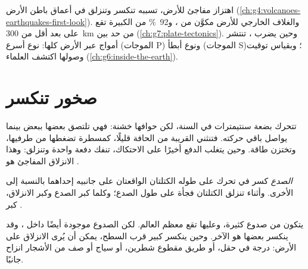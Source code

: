 \begin{recall}
\emph{} اهتزاز مفاجئ للأرض، تسببه  تنكسر وتنزلق في أعماق باطن
الأرض (\cref{ch:g4:volcanoes-earthquakes-first-look}). والغلاف الخارجي
للأرض مكوَّن من ، و92~\% من  الكبيرة تقع على بعد أقل من
\qty{300}{km} من حد بين  (\cref{ch:g7:plate-tectonics}). وحين
يضرب ، تنتشر أمواج عبر  الأرض كلها: نوع أسرع (الموجات P)
ونوع أبطأ (الموجات S)؛ وبقياس توقيت وصولها اكتشف العلماء 
(\cref{ch:g6:inside-the-earth}).
\end{recall}

\section{صخور تنكسر}

تتحرك  بضعة سنتيمترات في السنة، لكن حوافها خشنة: فهي تلتصق بعضها
ببعض بينما يواصل باقي  حركته. فتنثني  القريبة من الحافة
قليلًا، كمسطرة تضغطها من طرفيها، وتختزن طاقة. وحين يتغلب الدفع أخيرًا على
الاحتكاك، تنفك  دفعة واحدة وتنزلق: وهذا الانزلاق المفاجئ هو .

\begin{definition}[الصدع]\label{def:g7:earthquakes:fault}
\emph{الصدع} كسر في  تحرك على طوله الكتلتان الواقعتان على
جانبيه إحداهما بالنسبة إلى الأخرى. وأثناء  تنزلق الكتلتان فجأة على
طول الصدع؛ وكلما كبر الصدع وكبر الانزلاق، كبر .
\end{definition}

يتكون  من صدوع كثيرة، وعليها تقع معظم  العالم. لكن
الصدوع موجودة أيضًا داخل ، وقد ينكسر بعضها هو الآخر. وحين ينكسر
 كبير قرب السطح، يمكن أن يُرى الانزلاق على الأرض: درجة في حقل، أو طريق
مقطوع شطرين، أو سياج أو صف من الأشجار انزاح جانبًا.

